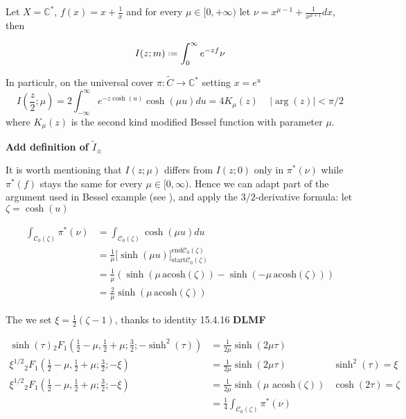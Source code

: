 \documentclass{article}
\newcommand{\C}{\mathbb{C}}
\begin{document}
Let $X=\C^*$, $f(x)=x+\frac{1}{x}$ and for every $\mu\in [0,+\infty)$ let $\nu=x^{\mu-1}+\frac{1}{x^{\mu+1}}dx$, then  

\begin{equation}
I(z;m)\defeq\int_{0}^{\infty}e^{-zf}\nu
\end{equation}

In particulr, on the universal cover $\pi\colon\tilde{C}\to \C^*$ setting $x=e^u$ 
\begin{equation}
I(\frac{z}{2};\mu)=2\int_{-\infty}^{\infty}e^{-z\cosh(u)}\cosh(\mu u)du=4K_\mu(z)\,\quad |\arg(z)|<\pi/2
\end{equation} 
where $K_\mu(z)$ is the second kind modified Bessel function with parameter $\mu$. 

\textbf{Add definition of $\tilde{I}_{\pm}$}

It is worth mentioning that $I(z;\mu)$ differs from $I(z;0)$ only in $\pi^*(\nu)$ while $\pi^*(f)$ stays the same for every $\mu\in [0,\infty)$. Hence we can adapt part of the argument used in Bessel example (see ), and apply the $3/2$-derivative formula: let $\zeta=\cosh(u)$

\begin{align*}
\int_{\mathcal{C}_0(\zeta)}\pi^*(\nu)&=\int_{\mathcal{C}_0(\zeta)}\cosh(\mu u)du\\
&=\frac{1}{\mu}\Big[\sinh(\mu u)\Big]_{\mathrm{start}\mathcal{C}_0(\zeta)}^{\mathrm{end}\mathcal{C}_0(\zeta)}\\
&=\frac{1}{\mu}\left(\sinh\left(\mu\,\mathrm{acosh}\left(\zeta\right)\right)-\sinh\left(-\mu\,\mathrm{acosh}\left(\zeta\right)\right)\right)\\
&=\frac{2}{\mu}\sinh\left(\mu\,\mathrm{acosh}\left(\zeta\right)\right)
\end{align*}


The we set $\xi=\frac{1}{2}\left(\zeta-1\right)$, thanks to identity 15.4.16 \textbf{DLMF}

\begin{align*}
\sinh(\tau) {}_2F_1\left(\frac{1}{2}-\mu,\frac{1}{2}+\mu;\frac{3}{2};-\sinh^2(\tau)\right)&=\frac{1}{2\mu}\sinh(2\mu\tau) & \\
\xi^{1/2} {}_2F_1\left(\frac{1}{2}-\mu,\frac{1}{2}+\mu;\frac{3}{2};-\xi\right)&=\frac{1}{2\mu}\sinh(2\mu\tau)  & \sinh^2(\tau)=\xi \\
\xi^{1/2} {}_2F_1\left(\frac{1}{2}-\mu,\frac{1}{2}+\mu;\frac{3}{2};-\xi\right)&=\frac{1}{2\mu}\sinh(\mu\,\,\mathrm{acosh}\left(\zeta\right))  & \cosh(2\tau)=\zeta \\
&=\frac{1}{4}\int_{\mathcal{C}_0(\zeta)}\pi^*(\nu) &\\
\end{align*}
\end{document}
